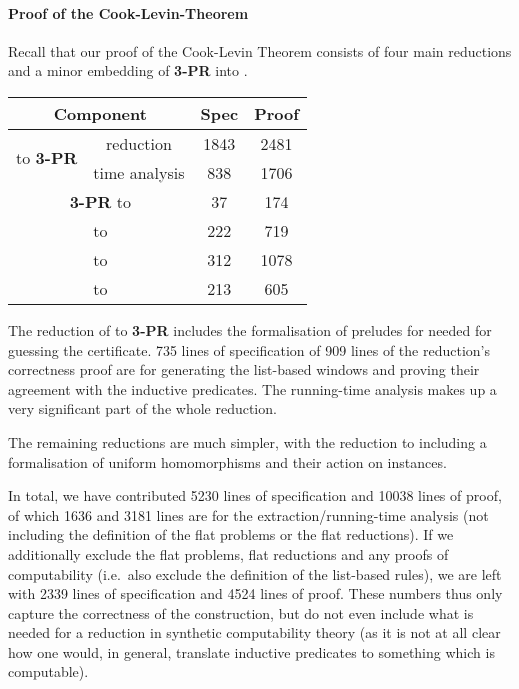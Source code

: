 \paragraph{Proof of the Cook-Levin-Theorem}
Recall that our proof of the Cook-Levin Theorem consists of four main reductions and a minor embedding of \textbf{3-PR} into \PR{}.

\begin{center}
  \begin{tabular}{cccc}
    \multicolumn{2}{c}{Component} & Spec & Proof \\
    \midrule
    \multirow{2}{*}{\gennp{} to \textbf{3-PR}} & reduction & 1843 & 2481 \\ %
                                               & time analysis & 838 & 1706 \\
    \multicolumn{2}{c}{\textbf{3-PR} to \PR{}} & 37 & 174 \\ 
    \multicolumn{2}{c}{\PR{} to \BPR{}} & 222 & 719 \\%
    \multicolumn{2}{c}{\BPR{} to \fsat{}} & 312 & 1078 \\
    \multicolumn{2}{c}{\fsat{} to \SAT{}} & 213 & 605 
  \end{tabular}
\end{center}

The reduction of \gennp{} to \textbf{3-PR} includes the formalisation of preludes for \PR{} needed for guessing the certificate. 735 lines of specification of 909 lines of the reduction's correctness proof are for generating the list-based windows and proving their agreement with the inductive predicates. 
The running-time analysis makes up a very significant part of the whole reduction. 

The remaining reductions are much simpler, with the reduction to \BPR{} including a formalisation of uniform homomorphisms and their action on \PR{} instances.

In total, we have contributed 5230 lines of specification and 10038 lines of proof, of which 1636 and 3181 lines are for the extraction/running-time analysis (not including the definition of the flat problems or the flat reductions). 
If we additionally exclude the flat problems, flat reductions and any proofs of computability (i.e.\ also exclude the definition of the list-based rules), we are left with 2339 lines of specification and 4524 lines of proof. These numbers thus only capture the correctness of the construction, but do not even include what is needed for a reduction in synthetic computability theory (as it is not at all clear how one would, in general, translate inductive predicates to something which is computable).
